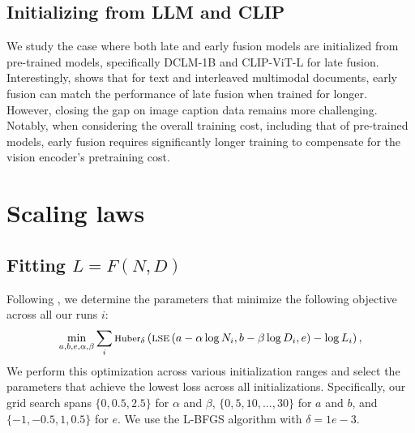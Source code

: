 














\subsection{Initializing from LLM and CLIP}
\label{sec:app_init_early_late}

We study the case where both late and early fusion models are initialized from pre-trained models, specifically DCLM-1B \citep{li2024datacomp} and CLIP-ViT-L \citep{radford2021learning} for late fusion. Interestingly,  shows that for text and interleaved multimodal documents, early fusion can match the performance of late fusion when trained for longer. However, closing the gap on image caption data remains more challenging. Notably, when considering the overall training cost, including that of pre-trained models, early fusion requires significantly longer training to compensate for the vision encoder’s pretraining cost.














                
                





\section{Scaling laws}
\label{app:scaling_laws}












\subsection{Fitting \(L = F(N, D)\)}  
Following \citep{hoffmann2022training}, we determine the parameters that minimize the following objective across all our runs \(i\):  
\begin{equation}
\footnotesize
    \min_{a,b,e,\alpha,\beta} \sum_{i} \text{Huber}_\delta \left( \text{LSE} \left( a - \alpha \log N_i, b - \beta \log D_i, e \right) - \log L_i \right),
\end{equation}  
We perform this optimization across various initialization ranges and select the parameters that achieve the lowest loss across all initializations. Specifically, our grid search spans \(\{0, 0.5, 2.5\}\) for \(\alpha\) and \(\beta\), \(\{0, 5, 10, ..., 30\}\) for \(a\) and \(b\), and \(\{-1, -0.5, 1, 0.5\}\) for \(e\). We use the L-BFGS algorithm with \(\delta=1e-3\).  



